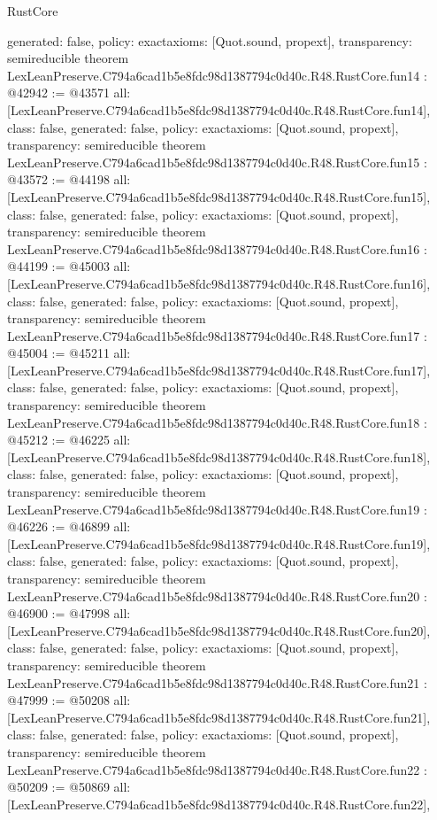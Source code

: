 \begin{lexlean}{RustCore}
\begin{coremodule}
{  generated: false,
  policy: exact{axioms: [Quot.sound, propext]},
  transparency: semireducible
}
theorem LexLeanPreserve.C794a6cad1b5e8fdc98d1387794c0d40c.R48.RustCore.fun14 : @42942 := @43571 {
  all: [LexLeanPreserve.C794a6cad1b5e8fdc98d1387794c0d40c.R48.RustCore.fun14],
  class: false,
  generated: false,
  policy: exact{axioms: [Quot.sound, propext]},
  transparency: semireducible
}
theorem LexLeanPreserve.C794a6cad1b5e8fdc98d1387794c0d40c.R48.RustCore.fun15 : @43572 := @44198 {
  all: [LexLeanPreserve.C794a6cad1b5e8fdc98d1387794c0d40c.R48.RustCore.fun15],
  class: false,
  generated: false,
  policy: exact{axioms: [Quot.sound, propext]},
  transparency: semireducible
}
theorem LexLeanPreserve.C794a6cad1b5e8fdc98d1387794c0d40c.R48.RustCore.fun16 : @44199 := @45003 {
  all: [LexLeanPreserve.C794a6cad1b5e8fdc98d1387794c0d40c.R48.RustCore.fun16],
  class: false,
  generated: false,
  policy: exact{axioms: [Quot.sound, propext]},
  transparency: semireducible
}
theorem LexLeanPreserve.C794a6cad1b5e8fdc98d1387794c0d40c.R48.RustCore.fun17 : @45004 := @45211 {
  all: [LexLeanPreserve.C794a6cad1b5e8fdc98d1387794c0d40c.R48.RustCore.fun17],
  class: false,
  generated: false,
  policy: exact{axioms: [Quot.sound, propext]},
  transparency: semireducible
}
theorem LexLeanPreserve.C794a6cad1b5e8fdc98d1387794c0d40c.R48.RustCore.fun18 : @45212 := @46225 {
  all: [LexLeanPreserve.C794a6cad1b5e8fdc98d1387794c0d40c.R48.RustCore.fun18],
  class: false,
  generated: false,
  policy: exact{axioms: [Quot.sound, propext]},
  transparency: semireducible
}
theorem LexLeanPreserve.C794a6cad1b5e8fdc98d1387794c0d40c.R48.RustCore.fun19 : @46226 := @46899 {
  all: [LexLeanPreserve.C794a6cad1b5e8fdc98d1387794c0d40c.R48.RustCore.fun19],
  class: false,
  generated: false,
  policy: exact{axioms: [Quot.sound, propext]},
  transparency: semireducible
}
theorem LexLeanPreserve.C794a6cad1b5e8fdc98d1387794c0d40c.R48.RustCore.fun20 : @46900 := @47998 {
  all: [LexLeanPreserve.C794a6cad1b5e8fdc98d1387794c0d40c.R48.RustCore.fun20],
  class: false,
  generated: false,
  policy: exact{axioms: [Quot.sound, propext]},
  transparency: semireducible
}
theorem LexLeanPreserve.C794a6cad1b5e8fdc98d1387794c0d40c.R48.RustCore.fun21 : @47999 := @50208 {
  all: [LexLeanPreserve.C794a6cad1b5e8fdc98d1387794c0d40c.R48.RustCore.fun21],
  class: false,
  generated: false,
  policy: exact{axioms: [Quot.sound, propext]},
  transparency: semireducible
}
theorem LexLeanPreserve.C794a6cad1b5e8fdc98d1387794c0d40c.R48.RustCore.fun22 : @50209 := @50869 {
  all: [LexLeanPreserve.C794a6cad1b5e8fdc98d1387794c0d40c.R48.RustCore.fun22],
}
\end{coremodule}
\end{lexlean}
